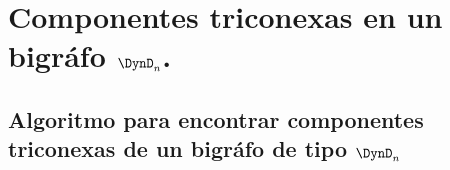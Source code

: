 \chapter{Componentes triconexas en un bigráfo $\DynD_{n}$.}

\section{Algoritmo para encontrar componentes triconexas de un bigráfo de tipo $\DynD_{n}$}

